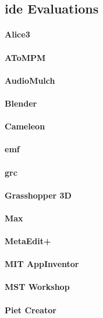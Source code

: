 


\subsection{\acs{ide} Evaluations}
\label{subsec:ide_evaluations}

\paragraph{Alice3}
\paragraph{AToMPM}
\paragraph{AudioMulch}
\paragraph{Blender}
\paragraph{Cameleon}
\paragraph{\ac{emf}}
\paragraph{\ac{grc}}
\paragraph{Grasshopper 3D }
\paragraph{Max}
\paragraph{MetaEdit+}
\paragraph{MIT AppInventor}
\paragraph{MST Workshop}
\paragraph{Piet Creator}
